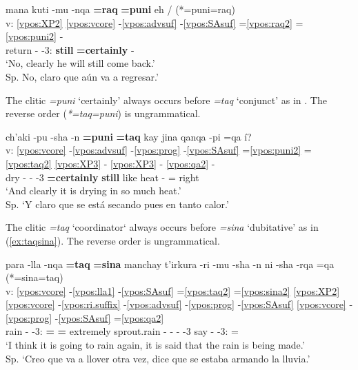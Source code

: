 \documentclass[output=paper]{langscibook}
\begin{document}
\ea \label{ex:raqpuni}{
    \glll {} mana kuti -mu -nqa \textbf{=raq} \textbf{=puni} eh / (*=puni=raq)  \\
    v: \ref{vpos:XP2} \ref{vpos:vcore} -\ref{vpos:advsuf} -\ref{vpos:SAsuf} =\ref{vpos:raq2} =\ref{vpos:puni2} - \\
    {} \Neg{} return -\Dir{} -3\Sg{}:\Fut{} \textbf{still} \textbf{=certainly} - \\
    \glt `No, clearly he will still come back.' \\  Sp. No, claro que aún va a regresar.' }
\z 




The clitic \textit{=puni} `certainly' always occurs before \textit{=taq} `conjunct' as in . The reverse order (\textit{*=taq=puni}) is ungrammatical.

\ea \label{ex:punitaq}{
    \glll {} ch'aki -pu -sha -n \textbf{=puni} \textbf{=taq} kay jina qanqa -pi =qa í?   \\
    v: \ref{vpos:vcore} -\ref{vpos:advsuf} -\ref{vpos:prog} -\ref{vpos:SAsuf} =\ref{vpos:puni2} =\ref{vpos:taq2} \ref{vpos:XP3} - \ref{vpos:XP3} - \ref{vpos:qa2} -  \\
    {} dry -\Cmpl{} -\Prog{} -3 \textbf{=certainly} \textbf{still} \Dem{} like heat -\Loc{} =\Top{} right \\
    \glt `And clearly it is drying in so much heat.' \\  Sp. `Y claro que se está secando pues en tanto calor.' }
\z 

The clitic \textit{=taq} `coordinator` always occurs before \textit{=sina} `dubitative' as in (\ref{ex:taqsina}). The reverse order is ungrammatical.

\ea \label{ex:taqsina}{
    \glll {} para -lla -nqa \textbf{=taq} \textbf{=sina} manchay t'irkura -ri -mu -sha -n ni -sha -rqa =qa (*=sina=taq) \\
    v: \ref{vpos:vcore} -\ref{vpos:lla1} -\ref{vpos:SAsuf} =\ref{vpos:taq2} =\ref{vpos:sina2} \ref{vpos:XP2} \ref{vpos:vcore} -\ref{vpos:ri.suffix} -\ref{vpos:advsuf} -\ref{vpos:prog} -\ref{vpos:SAsuf} \ref{vpos:vcore} -\ref{vpos:prog} -\ref{vpos:SAsuf} =\ref{vpos:qa2}  \\
    {} rain -\Limit{} -3\Sg{}:\Fut{} \textbf{=\Conj{}} \textbf{=\Dub{}} extremely sprout.rain -\Aff{} -\Dir{} -\Prog{} -3\Sg{} say -\Prog{} -3\Sg{}:\Pst{} =\Top{}   \\
    \glt `I think it is going to rain again, it is said that the rain is being made.' \\ Sp. `Creo que va a llover otra vez, dice que se estaba armando la lluvia.' }
\z 
\end{document}
